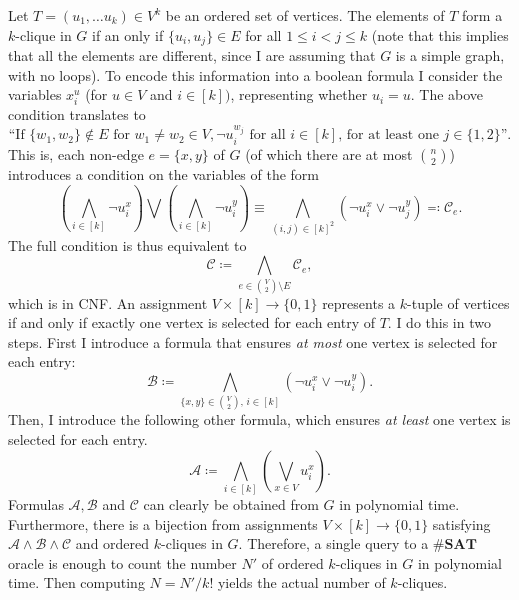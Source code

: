 \documentclass{amsart}
\theoremstyle{plain}
\theoremstyle{definition}
\newcommand{\sharpsat}{\textbf{\#SAT}}
\begin{document}
\begin{enumerate}[label=\textbf{Exercise \arabic*:}, leftmargin=0cm, labelwidth=-0.2cm, align=left]
            Let $T = (u_1, \dots u_k) \in V^k$ be an ordered set of vertices.
            The elements of $T$ form a $k$-clique in $G$ if an only if
            $\{u_i, u_j\} \in E$ for all $1 \leq i < j \leq k$
            (note that this implies that all the elements are different,
            since I are assuming that $G$ is a simple graph, with no loops). %
            To encode this information into a boolean formula I consider
            the variables $x_i^u$ (for $u \in V$ and $i \in [k])$,
            representing whether $u_i = u$.
            The above condition translates to 
            \[
                \text{``If } \{w_1, w_2\} \notin E \text{ for } w_1 \neq w_2 \in V,
                \neg u_i^{w_j} \text{ for all } i \in [k] \text{, for at least one }
                j \in \{1, 2\} \text{''}.
            \]
            This is, each non-edge $e = \{x, y\}$ of $G$ (of which there are at most $\binom{n}{2}$)
            introduces a condition on the variables of the form
            \[
                \left( \bigwedge_{i \in [k]} \neg u_i^x \right) \bigvee \left( \bigwedge_{i \in [k]} \neg u_i^y \right)
                \equiv \bigwedge_{(i, j) \in [k]^2} (\neg u_i^x \lor \neg u_j^y) \eqqcolon \mathcal{C}_e.
            \]
            The full condition is thus equivalent to
            \[
                \mathcal{C} \coloneqq \bigwedge_{e \in \binom{V}{2} \setminus E} \mathcal{C}_{e},
            \]
            which is in CNF.
            An assignment $V \times [k] \to \{0, 1\}$ represents a $k$-tuple of vertices if and only if
            exactly one vertex is selected for each entry of $T$.
            I do this in two steps.
            First I introduce a formula that ensures \emph{at most} one vertex is selected for each entry:
            \[
                \mathcal{B} \coloneqq \bigwedge_{\{x, y\} \in \binom{V}{2},\, i \in [k]} (\neg u_i^x \lor \neg u_i^y).
            \]
            Then, I introduce the following other formula, which ensures \emph{at least} one vertex is selected
            for each entry.
            \[
                \mathcal{A} \coloneqq \bigwedge_{i \in [k]} \left( \bigvee_{x \in V} u_i^x \right).
            \]
            Formulas $\mathcal{A}, \mathcal{B}$ and $\mathcal{C}$
            can clearly be obtained from $G$ in polynomial time.
            Furthermore, there is a bijection from assignments
            $V \times [k] \to \{0, 1\}$ satisfying
            $\mathcal{A} \land \mathcal{B} \land \mathcal{C}$
            and ordered $k$-cliques in $G$.
            Therefore, a single query to a $\sharpsat$ oracle is enough to count the number $N'$ of ordered
            $k$-cliques in $G$ in polynomial time.
            Then computing $N = N' / k!$ yields the actual number of $k$-cliques.

    \end{enumerate}
\end{document}
